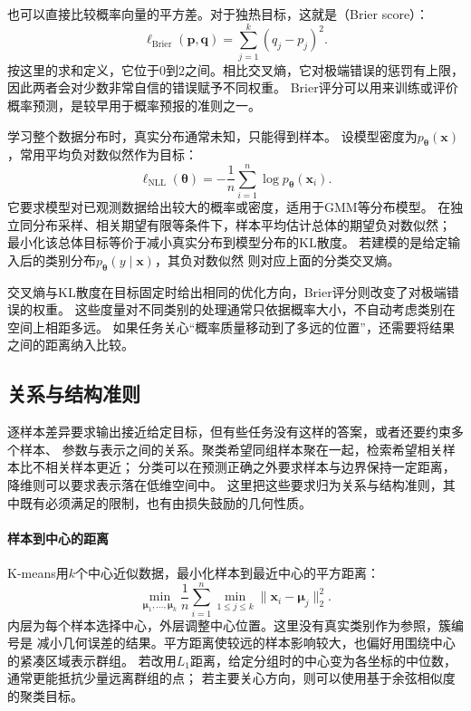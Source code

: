 也可以直接比较概率向量的平方差。对于独热目标，这就是（Brier score）：
\begin{equation}
  \ell_{\mathrm{Brier}}(\bm{p},\bm{q})
  =\sum_{j=1}^{k}(q_j-p_j)^2.
  \label{eq:models-brier}
\end{equation}
按这里的求和定义，它位于$0$到$2$之间。相比交叉熵，它对极端错误的惩罚有上限，
因此两者会对少数非常自信的错误赋予不同权重。
Brier评分可以用来训练或评价概率预测，是较早用于概率预报的准则之一。

学习整个数据分布时，真实分布通常未知，只能得到样本。
设模型密度为$p_{\bm{\theta}}(\bm{x})$，常用平均负对数似然作为目标：
\begin{equation}
  \ell_{\mathrm{NLL}}(\bm{\theta})
  =-\frac{1}{n}\sum_{i=1}^{n}\log p_{\bm{\theta}}(\bm{x}_i).
  \label{eq:models-negative-log-likelihood}
\end{equation}
它要求模型对已观测数据给出较大的概率或密度，适用于GMM等分布模型。
在独立同分布采样、相关期望有限等条件下，样本平均估计总体的期望负对数似然；
最小化该总体目标等价于减小真实分布到模型分布的KL散度。
若建模的是给定输入后的类别分布$p_{\bm{\theta}}(y\mid\bm{x})$，其负对数似然
则对应上面的分类交叉熵。

交叉熵与KL散度在目标固定时给出相同的优化方向，Brier评分则改变了对极端错误的权重。
这些度量对不同类别的处理通常只依据概率大小，不自动考虑类别在空间上相距多远。
如果任务关心“概率质量移动到了多远的位置”，还需要将结果之间的距离纳入比较。

\subsection{关系与结构准则}
\label{sec:models-spatial-objectives}

逐样本差异要求输出接近给定目标，但有些任务没有这样的答案，或者还要约束多个样本、
参数与表示之间的关系。聚类希望同组样本聚在一起，检索希望相关样本比不相关样本更近；
分类可以在预测正确之外要求样本与边界保持一定距离，降维则可以要求表示落在低维空间中。
这里把这些要求归为关系与结构准则，其中既有必须满足的限制，也有由损失鼓励的几何性质。

\paragraph{样本到中心的距离}

K-means用$k$个中心近似数据，最小化样本到最近中心的平方距离：
\begin{equation}
  \min_{\bm{\mu}_1,\ldots,\bm{\mu}_k}
  \frac{1}{n}\sum_{i=1}^{n}\min_{1\leq j\leq k}
  \lVert\bm{x}_i-\bm{\mu}_j\rVert_2^2.
  \label{eq:models-kmeans-objective}
\end{equation}
内层为每个样本选择中心，外层调整中心位置。这里没有真实类别作为参照，簇编号是
减小几何误差的结果。平方距离使较远的样本影响较大，也偏好用围绕中心的紧凑区域表示群组。
若改用$L_1$距离，给定分组时的中心变为各坐标的中位数，通常更能抵抗少量远离群组的点；
若主要关心方向，则可以使用基于余弦相似度的聚类目标。

